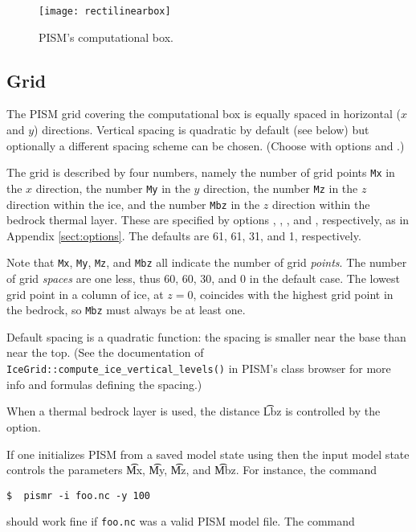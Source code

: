 \begin{figure}[ht]
\texttt{[image: rectilinearbox]}
\caption{PISM's computational box.}
\label{fig:rectilinearbox}
\end{figure}


\subsection{Grid}
\label{subsect:grid}
The PISM grid covering the computational box is equally spaced in horizontal ($x$ and $y$) directions.  Vertical spacing is quadratic by default (see below) but optionally a different spacing scheme can be chosen.  (Choose with options  and .)

The grid is described by four numbers, namely the number of grid points \verb|Mx| in the $x$ direction, the number \verb|My| in the $y$ direction, the number \verb|Mz| in the $z$ direction within the ice, and the number \verb|Mbz| in the $z$ direction within the bedrock thermal layer.  These are specified by options , , , and , respectively, as in Appendix \ref{sect:options}.  The defaults are 61, 61, 31, and 1, respectively.

Note that \verb|Mx|, \verb|My|, \verb|Mz|, and \verb|Mbz| all indicate the number of grid \emph{points}.  The number of grid \emph{spaces} are one less, thus 60, 60, 30, and 0 in the default case.  The lowest grid point in a column of ice, at $z=0$, coincides with the highest grid point in the bedrock, so \verb|Mbz| must always be at least one.

Default spacing is a quadratic function: the spacing is smaller near the base than near the top. (See the documentation of \verb|IceGrid::compute_ice_vertical_levels()| in PISM's class browser for more info and formulas defining the spacing.)

When a thermal bedrock layer is used, the distance \t{Lbz} is controlled by the  option.

If one initializes PISM from a saved model state using  then the input model state controls the parameters \t{Mx}, \t{My}, \t{Mz}, and \t{Mbz}.  For instance, the command

\verb|$  pismr -i foo.nc -y 100|

\noindent should work fine if \verb|foo.nc| was a valid PISM model file.  The command


